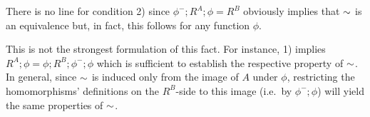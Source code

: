 \documentclass[10pt]{article}
\begin{document}
\noindent
There is no line for condition 2) since $\phi^-;R^A;\phi=R^B$
obviously implies that $\sim$ is an equivalence but, in fact, this
follows for any function $\phi$.

This is not the strongest formulation of this fact.
For instance, 1) implies
$R^A;\phi=\phi;R^B;\phi^-;\phi$ which is sufficient to establish the
respective property of $\sim$. In general, since $\sim$ is induced
only from the image of $A$ under $\phi$, restricting the
homomorphisms' definitions on the $R^B$-side to this image (i.e.\ by
$\phi^-;\phi$) will yield the same properties of $\sim$.



\end{document}
